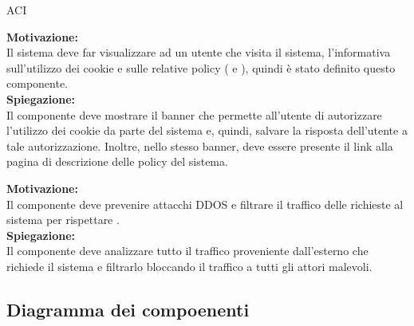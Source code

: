 \begin{listaPersonale}{ACI}

    \textbf{Motivazione:}\\
    Il sistema deve far visualizzare ad un utente che visita il sistema, l'informativa sull'utilizzo dei cookie e sulle relative policy ( e ), quindi è stato definito questo componente.\\

    \textbf{Spiegazione:}\\
    Il componente deve mostrare il banner che permette all'utente di autorizzare l'utilizzo dei cookie da parte del sistema e, quindi, salvare la risposta dell'utente a tale autorizzazione. Inoltre, nello stesso banner, deve essere presente il link alla pagina di descrizione delle policy del sistema.

    \textbf{Motivazione:}\\
    Il componente deve prevenire attacchi DDOS e filtrare il traffico delle richieste al sistema per rispettare .\\

    \textbf{Spiegazione:}\\
    Il componente deve analizzare tutto il traffico proveniente dall'esterno che richiede il sistema e filtrarlo bloccando il traffico a tutti gli attori malevoli.
\end{listaPersonale}






































\subsection{Diagramma dei compoenenti}
\label{secD2:DiagrammaComponenti}

